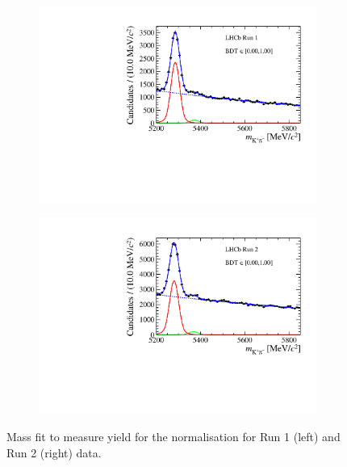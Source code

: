 {{{\begin{figure}[htbp]
    \centering
  \begin{subfigure}[b]{0.48\textwidth}
        \includegraphics[width=  \textwidth]{./Figs/BFAnalysis/Bd2KPi_mass_RunI_BDTbinNone.pdf}
    \end{subfigure}
    \begin{subfigure}[b]{0.48\textwidth}
       \includegraphics[width=\textwidth]{./Figs/BFAnalysis/Bd2KPi_mass_RunII_BDTbinNone.pdf}
   \end{subfigure}
    \caption{Mass fit to measure \bdkpi yield for the normalisation for Run 1 (left) and Run 2 (right) data. }
    \label{fig:Bdkpiyield}
\end{figure}



}}}
